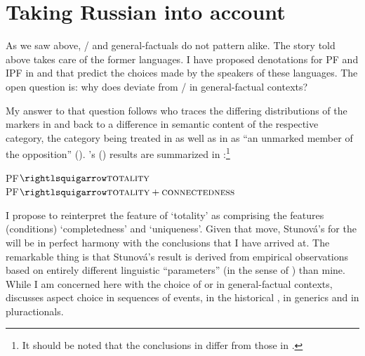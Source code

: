 \documentclass[output=paper,modfonts,newtxmath,hidelinks]{langscibook}
\begin{document}

\section{Taking Russian into account}\label{13:s8} 
As we saw above, / and  general-factuals do not pattern alike. The story told above takes care of the former languages. 
I have proposed denotations for PF and IPF in  and  that predict the  choices made by the speakers of these languages. 
The open question is: why does  deviate from / in general-factual contexts? 

My answer to that question follows \citet{Stunova1991} who traces the differing distributions of the  markers in  and  
back to a difference in semantic content of the respective  category, the  category being treated in  as well as in  
as ``an unmarked member of the  opposition'' 
(\citealt[297]{Stunova1991}). \citeauthor{Stunova1991}'s (\citeyear{Stunova1991}) results are summarized in :\footnote{It should be noted that the conclusions 
in \citet{Stunova1993} differ from those in \citet{Stunova1991}.}

\begin{exe}
\ex\label{13:czru}
PF${}\rightlsquigarrow\textsc{totality}$\smallskip\\
PF${}\rightlsquigarrow\textsc{totality}+\textsc{connectedness}$
\end{exe}

\noindent I propose to reinterpret the feature of `totality' as comprising the features (conditions) `completedness' and `uniqueness'. Given that move, 
Stunov\'a's  for the   will be in perfect harmony with the conclusions that I have arrived at. 
The remarkable thing is that Stunov\'a's result is derived from empirical observations based on entirely different linguistic 
``parameters'' (in the sense of \citealt{Dickey2000}) than mine. While I am concerned here with the choice of  or  
in general-factual contexts, \citet{Stunova1991} discusses aspect choice in sequences of events,
in the historical , in generics and in pluractionals.  
\end{document}
